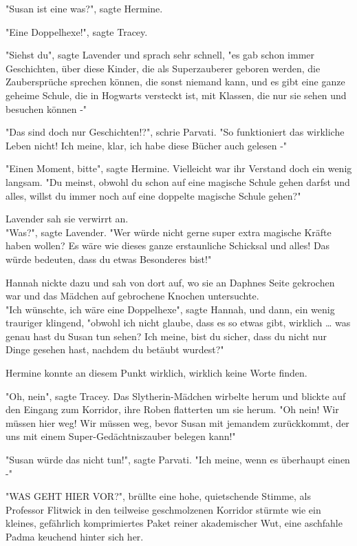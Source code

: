 {"Susan ist eine was?", sagte Hermine.

"Eine Doppelhexe!", sagte Tracey.

"Siehst du", sagte Lavender und sprach sehr schnell, "es gab schon immer Geschichten, über diese Kinder, die als Superzauberer geboren werden, die Zaubersprüche sprechen können, die sonst niemand kann, und es gibt eine ganze geheime Schule, die in Hogwarts versteckt ist, mit Klassen, die nur sie sehen und besuchen können -"

"Das sind doch nur Geschichten!?", schrie Parvati. "So funktioniert das wirkliche Leben nicht! Ich meine, klar, ich habe diese Bücher auch gelesen -"

"Einen Moment, bitte", sagte Hermine. Vielleicht war ihr Verstand doch ein wenig langsam. "Du meinst, obwohl du schon auf eine magische Schule gehen darfst und alles, willst du immer noch auf eine doppelte magische Schule gehen?"

Lavender sah sie verwirrt an.\\ "Was?", sagte Lavender. "Wer würde nicht gerne super extra magische Kräfte haben wollen? Es wäre wie dieses ganze erstaunliche Schicksal und alles! Das würde bedeuten, dass du etwas Besonderes bist!"

Hannah nickte dazu und sah von dort auf, wo sie an Daphnes Seite gekrochen war und das Mädchen auf gebrochene Knochen untersuchte.\\ "Ich wünschte, ich wäre eine Doppelhexe", sagte Hannah, und dann, ein wenig trauriger klingend, "obwohl ich nicht glaube, dass es so etwas gibt, wirklich … was genau hast du Susan tun sehen? Ich meine, bist du sicher, dass du nicht nur Dinge gesehen hast, nachdem du betäubt wurdest?"

Hermine konnte an diesem Punkt wirklich, wirklich keine Worte finden.

"Oh, nein", sagte Tracey. Das Slytherin-Mädchen wirbelte herum und blickte auf den Eingang zum Korridor, ihre Roben flatterten um sie herum. "Oh nein! Wir müssen hier weg! Wir müssen weg, bevor Susan mit jemandem zurückkommt, der uns mit einem Super-Gedächtniszauber belegen kann!"

"Susan würde das nicht tun!", sagte Parvati. "Ich meine, wenn es überhaupt einen -"

"WAS GEHT HIER VOR?", brüllte eine hohe, quietschende Stimme, als Professor Flitwick in den teilweise geschmolzenen Korridor stürmte wie ein kleines, gefährlich komprimiertes Paket reiner akademischer Wut, eine aschfahle Padma keuchend hinter sich her.

}
